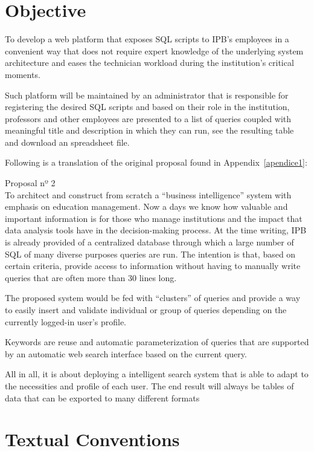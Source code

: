 \section{Objective}\label{objective}

To develop a web platform that exposes \gls{SQL} scripts to \gls{IPB}'s employees in a convenient way that does not require expert knowledge of the underlying system architecture and eases the technician workload during the institution's critical moments.

Such platform will be maintained by an administrator that is responsible for registering the desired \gls{SQL} scripts and based on their role in the institution, professors and other employees are presented to a list of queries coupled with meaningful title and description in which they can run, see the resulting table and download an spreadsheet file.

Following is a translation of the original proposal found in Appendix~\ref{apendice1}:
\begin{displayquote}
  Proposal nº 2\\
  To architect and construct from scratch a ``business intelligence'' system with emphasis on education management.
  Now a days we know how valuable and important information is for those who manage institutions and the impact that data analysis tools have in the decision-making process.
  At the time writing, \gls{IPB} is already provided of a centralized database through which a large number of \gls{SQL} of many diverse purposes queries are run.
  The intention is that, based on certain criteria, provide access to information without having to manually write queries that are often more than 30 lines long.

  The proposed system would be fed with ``clusters'' of queries and provide a way to easily insert and validate individual or group of queries depending on the currently logged-in user's profile.

  Keywords are reuse and automatic parameterization of queries that are supported by an automatic web search interface based on the current query.

  All in all, it is about deploying a intelligent search system that is able to adapt to the necessities and profile of each user. The end result will always be tables of data that can be exported to many different formats
\end{displayquote}

\section{Textual Conventions}

